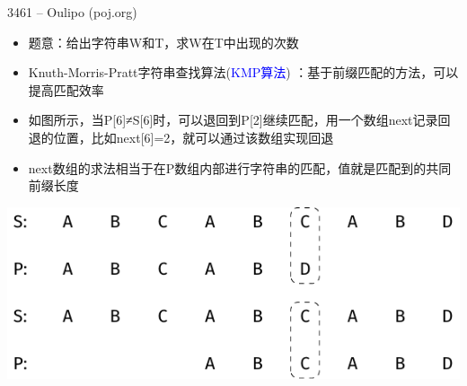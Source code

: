 \begin{frame}{3461 -- Oulipo (poj.org)}
    \begin{itemize}
        \item 题意：给出字符串W和T，求W在T中出现的次数
        \item Knuth-Morris-Pratt字符串查找算法(\textcolor{blue}{KMP算法}) ：基于前缀匹配的方法，可以提高匹配效率
        \item 如图所示，当P[6]≠S[6]时，可以退回到P[2]继续匹配，用一个数组next记录回退的位置，比如next[6]=2，就可以通过该数组实现回退
        \item next数组的求法相当于在P数组内部进行字符串的匹配，值就是匹配到的共同前缀长度
    \end{itemize}
    \includegraphics[scale=.9,center]{fig/6-9.pdf}  
\end{frame}

